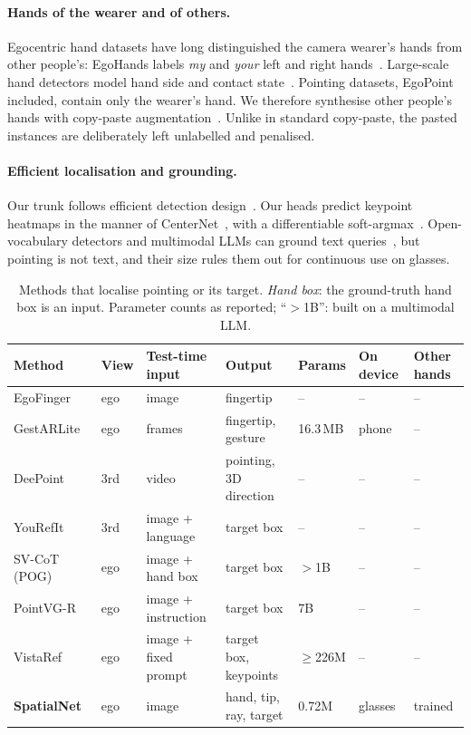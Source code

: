 \paragraph{Hands of the wearer and of others.} Egocentric hand datasets have long distinguished the camera wearer's hands from other people's: EgoHands labels \emph{my} and \emph{your} left and right hands~\cite{bambach2015lending}. Large-scale hand detectors model hand side and contact state~\cite{shan2020understanding}. Pointing datasets, EgoPoint included, contain only the wearer's hand. We therefore synthesise other people's hands with copy-paste augmentation~\cite{dwibedi2017cut,ghiasi2021simple}. Unlike in standard copy-paste, the pasted instances are deliberately left unlabelled and penalised.

\paragraph{Efficient localisation and grounding.} Our trunk follows efficient detection design~\cite{ma2018shufflenet,tan2020efficientdet}. Our heads predict keypoint heatmaps in the manner of CenterNet~\cite{zhou2019objects}, with a differentiable soft-argmax~\cite{sun2018integral}. Open-vocabulary detectors and multimodal LLMs can ground text queries~\cite{liu2024grounding,peng2023kosmos,you2024ferret,bai2025qwen25vl}, but pointing is not text, and their size rules them out for continuous use on glasses.

\begin{table}[t]
  \caption{Methods that localise pointing or its target. \emph{Hand box}: the ground-truth hand box is an input. Parameter counts as reported; ``$>$1B'': built on a multimodal LLM.}
  \label{tab:related}
  \footnotesize
  \setlength{\tabcolsep}{3pt}
  \begin{tabular}{lllllll}
    \toprule
    Method & View & Test-time input & Output & Params & On device & Other hands \\
    \midrule
    EgoFinger~\cite{huang2016pointing} & ego & image & fingertip & -- & -- & -- \\
    GestARLite~\cite{jain2019gestarlite} & ego & frames & fingertip, gesture & 16.3\,MB & phone & -- \\
    DeePoint~\cite{nakamura2023deepoint} & 3rd & video & pointing, 3D direction & -- & -- & -- \\
    YouRefIt~\cite{chen2021yourefit} & 3rd & image + language & target box & -- & -- & -- \\
    SV-CoT (POG)~\cite{egopoint} & ego & image + hand box & target box & $>$1B & -- & -- \\
    PointVG-R~\cite{li2026pointvgr} & ego & image + instruction & target box & 7B & -- & -- \\
    VistaRef~\cite{li2026vistaref} & ego & image + fixed prompt & target box, keypoints & $\geq$226M & -- & -- \\
    \textbf{SpatialNet} & ego & image & hand, tip, ray, target & 0.72M & glasses & trained \\
    \bottomrule
  \end{tabular}
\end{table}
